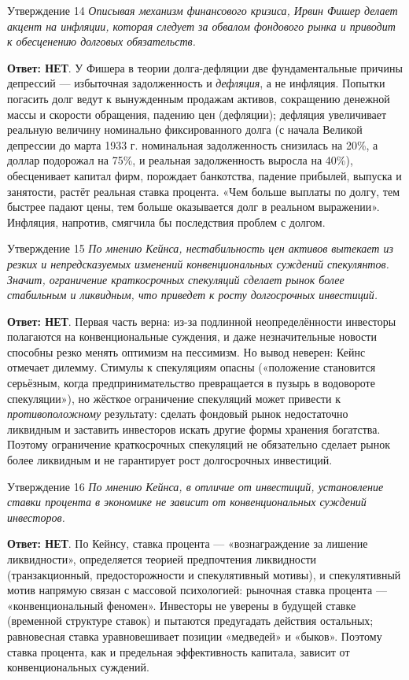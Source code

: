 \documentclass[10pt,a4paper]{article}
\newcommand{\qnet}{\textbf{\color{nored}Ответ: НЕТ}}
\newenvironment{answer}[2]{%
  \begin{qbox}{Утверждение #1}
  \textit{#2}\par\smallskip
}{%
  \end{qbox}\vspace{2pt}
}
\begin{document}
\begin{answer}{14}{Описывая механизм финансового кризиса, Ирвин Фишер делает акцент на инфляции, которая следует за обвалом фондового рынка и приводит к обесценению долговых обязательств.}
\qnet. У Фишера в теории долга-дефляции две фундаментальные причины депрессий --- избыточная задолженность и \emph{дефляция}, а не инфляция. Попытки погасить долг ведут к вынужденным продажам активов, сокращению денежной массы и скорости обращения, падению цен (дефляции); дефляция увеличивает реальную величину номинально фиксированного долга (с начала Великой депрессии до марта 1933 г. номинальная задолженность снизилась на 20\%, а доллар подорожал на 75\%, и реальная задолженность выросла на 40\%), обесценивает капитал фирм, порождает банкотства, падение прибылей, выпуска и занятости, растёт реальная ставка процента. «Чем больше выплаты по долгу, тем быстрее падают цены, тем больше оказывается долг в реальном выражении». Инфляция, напротив, смягчила бы последствия проблем с долгом.
\end{answer}

\begin{answer}{15}{По мнению Кейнса, нестабильность цен активов вытекает из резких и непредсказуемых изменений конвенциональных суждений спекулянтов. Значит, ограничение краткосрочных спекуляций сделает рынок более стабильным и ликвидным, что приведет к росту долгосрочных инвестиций.}
\qnet. Первая часть верна: из-за подлинной неопределённости инвесторы полагаются на конвенциональные суждения, и даже незначительные новости способны резко менять оптимизм на пессимизм. Но вывод неверен: Кейнс отмечает дилемму. Стимулы к спекуляциям опасны («положение становится серьёзным, когда предпринимательство превращается в пузырь в водовороте спекуляции»), но жёсткое ограничение спекуляций может привести к \emph{противоположному} результату: сделать фондовый рынок недостаточно ликвидным и заставить инвесторов искать другие формы хранения богатства. Поэтому ограничение краткосрочных спекуляций не обязательно сделает рынок более ликвидным и не гарантирует рост долгосрочных инвестиций.
\end{answer}

\begin{answer}{16}{По мнению Кейнса, в отличие от инвестиций, установление ставки процента в экономике не зависит от конвенциональных суждений инвесторов.}
\qnet. По Кейнсу, ставка процента --- «вознаграждение за лишение ликвидности», определяется теорией предпочтения ликвидности (транзакционный, предосторожности и спекулятивный мотивы), и спекулятивный мотив напрямую связан с массовой психологией: рыночная ставка процента --- «конвенциональный феномен». Инвесторы не уверены в будущей ставке (временной структуре ставок) и пытаются предугадать действия остальных; равновесная ставка уравновешивает позиции «медведей» и «быков». Поэтому ставка процента, как и предельная эффективность капитала, зависит от конвенциональных суждений.
\end{answer}
\end{document}
